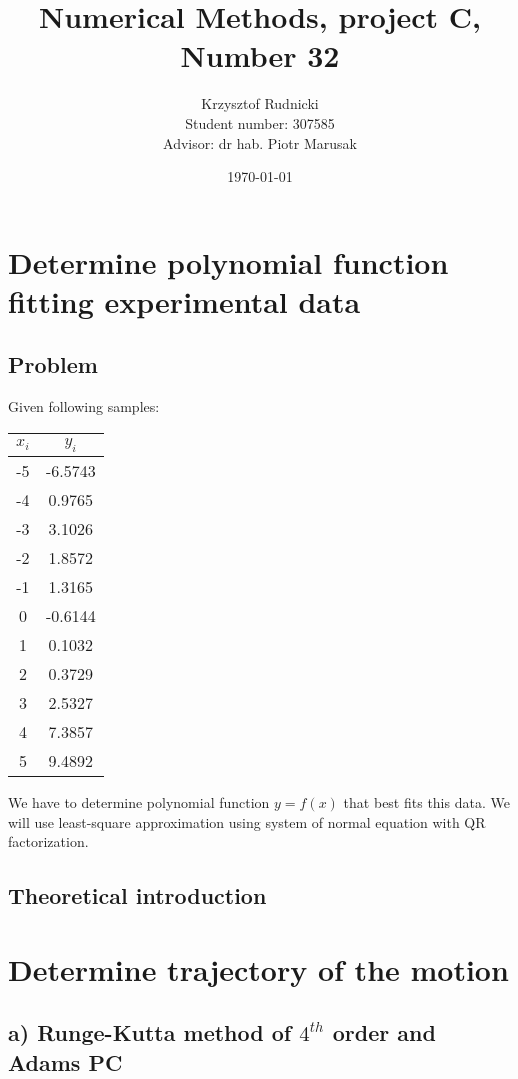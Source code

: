 \documentclass[12pt]{report}
\title{Numerical Methods, project C, Number 32}
\author{Krzysztof Rudnicki\\ Student number: 307585 \\ Advisor: dr hab. Piotr Marusak}
\date{\today}
\begin{document}
\maketitle
\tableofcontents

\chapter{Determine polynomial function fitting experimental data}
\section{Problem}
Given following samples:
\begin{center}
  \begin{tabular}{| c | c |}
\hline
$x_i$ & $y_i$ \\
\hline
-5 & -6.5743\\
\hline
-4 & 0.9765\\
\hline
-3 & 3.1026\\
\hline
-2 & 1.8572 \\
\hline
-1 & 1.3165 \\
\hline
0 & -0.6144 \\
\hline
1 & 0.1032 \\
\hline
2 & 0.3729 \\
\hline
3 & 2.5327 \\
\hline
4 & 7.3857 \\
\hline
5 & 9.4892 \\
\hline

\end{tabular}
\end{center}

We have to determine polynomial function $ y  = f(x) $ that best fits this data.
We will use least-square approximation using system of normal equation with QR factorization.

\section{Theoretical introduction}



\chapter{Determine trajectory of the motion}
\section{a) Runge-Kutta method of $4^{th}$ order and Adams PC}
\end{document}
